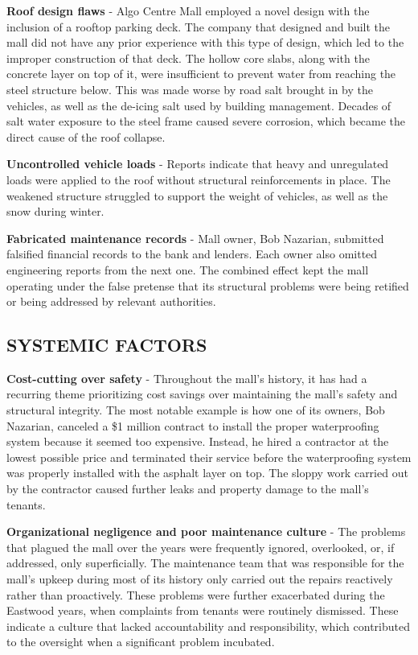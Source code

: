 \documentclass[12pt]{article}
\begin{document}
\textbf{Roof design flaws} - Algo Centre Mall employed a novel design with the inclusion of a rooftop parking deck. The company that designed and built the mall did not have any prior experience with this type of design, which led to the improper construction of that deck. The hollow core slabs, along with the concrete layer on top of it, were insufficient to prevent water from reaching the steel structure below. This was made worse by road salt brought in by the vehicles, as well as the de-icing salt used by building management. Decades of salt water exposure to the steel frame caused severe corrosion, which became the direct cause of the roof collapse. 

\textbf{Uncontrolled vehicle loads} - Reports indicate that heavy and unregulated loads were applied to the roof without structural reinforcements in place. The weakened structure struggled to support the weight of vehicles, as well as the snow during winter. 

\textbf{Fabricated maintenance records} - Mall owner, Bob Nazarian, submitted falsified financial records to the bank and lenders. Each owner also omitted engineering reports from the next one. The combined effect kept the mall operating under the false pretense that its structural problems were being retified or being addressed by relevant authorities. 
 

\subsection{SYSTEMIC FACTORS}

\textbf{Cost-cutting over safety} - Throughout the mall's history, it has had a recurring theme prioritizing cost savings over maintaining the mall's safety and structural integrity. The most notable example is how one of its owners, Bob Nazarian, canceled a \$1 million contract to install the proper waterproofing system because it seemed too expensive. Instead, he hired a contractor at the lowest possible price and terminated their service before the waterproofing system was properly installed with the asphalt layer on top. The sloppy work carried out by the contractor caused further leaks and property damage to the mall's tenants.

\textbf{Organizational negligence and poor maintenance culture} - The problems that plagued the mall over the years were frequently ignored, overlooked, or, if addressed, only superficially. The maintenance team that was responsible for the mall's upkeep during most of its history only carried out the repairs reactively rather than proactively. These problems were further exacerbated during the Eastwood years, when complaints from tenants were routinely dismissed. These indicate a culture that lacked accountability and responsibility, which contributed to the oversight when a significant problem incubated.
\end{document}
